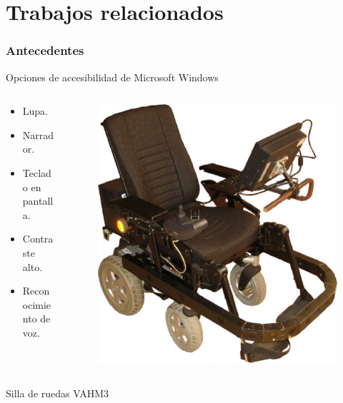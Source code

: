 \section{Trabajos relacionados}

\begin{frame}
\frametitle{Antecedentes}
\begin{block}{Opciones de accesibilidad de Microsoft Windows
 \cite{DanielHubbell2016}}
\begin{columns}[T]
\begin{column}{.5\textwidth}

	\begin{itemize}
		\item Lupa.
		\item Narrador.
		\item Teclado en pantalla.
		\item Contraste alto.
		\item Reconocimiento de voz.
	\end{itemize}
\end{column}
\begin{column}{.5\textwidth}
	\begin{figure}[h]
	\centering
	\includegraphics[width=0.6 \columnwidth]{Imagenes/Silla.eps}
	\label{fig:silla}
	\end{figure}
\end{column}
\end{columns}
\end{block}

\begin{block}{Silla de ruedas VAHM3 \cite{Grasse2010}}

\end{block}
\end{frame}

